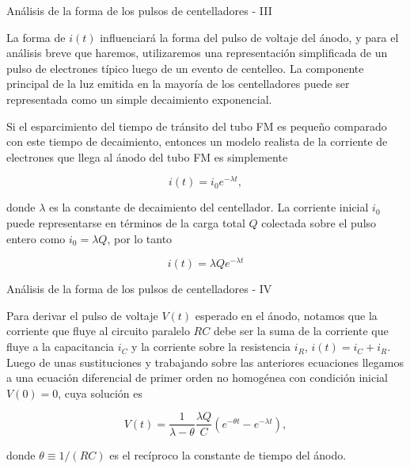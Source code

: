\documentclass[a4paper,10pt]{beamer}
\begin{document}
\begin{frame}{Análisis de la forma de los pulsos de centelladores - III}
 
 \begin{justify}
 La forma de $i(t)$ influenciará la forma del pulso de voltaje del ánodo, y para 
 el análisis breve que haremos, utilizaremos una representación simplificada 
 de un pulso de electrones típico luego de un evento de centelleo. La componente 
 principal de la luz emitida en la mayoría de los centelladores puede ser 
 representada como un simple decaimiento exponencial.
 
 \vspace{.3cm}
 
 Si el esparcimiento del tiempo de tránsito del tubo FM es pequeño comparado con 
 este tiempo de decaimiento, entonces un modelo realista de la corriente de electrones 
 que llega al ánodo del tubo FM es simplemente
 
 \begin{equation}
  i(t) = i_0e^{-\lambda t},
 \end{equation}
 
 donde $\lambda$ es la constante de decaimiento del centellador. La corriente 
 inicial $i_0$puede representarse en términos de la carga total $Q$ colectada 
 sobre el pulso entero como $i_0 = \lambda Q$, por lo tanto
 
 \begin{equation}
  i(t) = \lambda Q e^{-\lambda t}
 \end{equation}
 \end{justify}
 
\end{frame}

\begin{frame}{Análisis de la forma de los pulsos de centelladores - IV}
 
 \begin{justify}
 Para derivar el pulso de voltaje $V(t)$ esperado en el ánodo, notamos que la 
 corriente que fluye al circuito paralelo $RC$ debe ser la suma de la corriente 
 que fluye a la capacitancia $i_C$ y la corriente sobre la resistencia $i_R$, 
 $i(t) = i_C + i_R$. Luego de unas sustituciones y trabajando sobre las anteriores 
 ecuaciones llegamos a una ecuación diferencial de primer orden no homogénea con 
 condición inicial $V(0) = 0$, cuya solución es 
 
 \begin{equation}
  V(t) = \frac{1}{\lambda - \theta}\frac{\lambda Q}{C}(e^{-\theta t} - e^{- \lambda t}),
 \end{equation}

 donde $\theta \equiv 1/(RC)$ es el recíproco la constante de tiempo del ánodo.
 
 \end{justify}
\end{frame}
\end{document}
